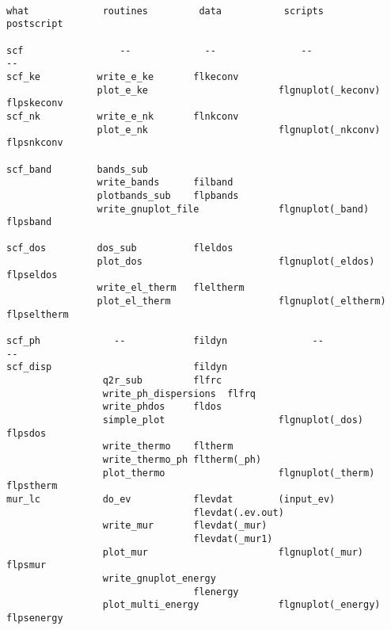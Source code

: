 \documentclass[12pt,a4paper]{article}
\begin{document}
\begin{verbatim}

what             routines         data           scripts            postscript

scf                 --             --               --                 --
scf_ke          write_e_ke       flkeconv
                plot_e_ke                       flgnuplot(_keconv)  flpskeconv
scf_nk          write_e_nk       flnkconv
                plot_e_nk                       flgnuplot(_nkconv)  flpsnkconv

scf_band        bands_sub
                write_bands      filband
                plotbands_sub    flpbands
                write_gnuplot_file              flgnuplot(_band)    flpsband     

scf_dos         dos_sub          fleldos
                plot_dos                        flgnuplot(_eldos)   flpseldos
                write_el_therm   fleltherm
                plot_el_therm                   flgnuplot(_eltherm) flpseltherm

scf_ph             --            fildyn               --                  --
scf_disp                         fildyn
                 q2r_sub         flfrc
                 write_ph_dispersions  flfrq
                 write_phdos     fldos
                 simple_plot                    flgnuplot(_dos)     flpsdos
                 write_thermo    fltherm
                 write_thermo_ph fltherm(_ph)
                 plot_thermo                    flgnuplot(_therm)   flpstherm
mur_lc           do_ev           flevdat        (input_ev)
                                 flevdat(.ev.out)
                 write_mur       flevdat(_mur)
                                 flevdat(_mur1)
                 plot_mur                       flgnuplot(_mur)     flpsmur
                 write_gnuplot_energy
                                 flenergy
                 plot_multi_energy              flgnuplot(_energy)  flpsenergy


\end{verbatim}
\end{document}
